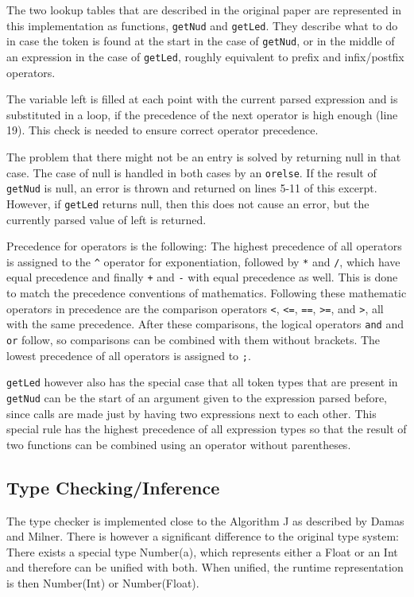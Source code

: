 \documentclass[12pt]{article}
\begin{document}
The two lookup tables that are described in the original paper are represented
in this implementation as functions,
\texttt{getNud} and \texttt{getLed}.
They describe what to do in case the token is found at the start in the case of \texttt{getNud},
or in the middle of an expression in the case of \texttt{getLed}, roughly equivalent to
prefix and infix/postfix operators.

The variable left is filled at each point with the current parsed expression
and is substituted in a loop, if the precedence of the next operator is high enough (line 19).
This check is needed to ensure correct operator precedence.

The problem that there might not be an entry is solved by returning null
in that case. The case of null is handled in both cases by an \texttt{orelse}.
If the result of \texttt{getNud} is null, an error is thrown and returned on lines 5-11 of this excerpt.
However, if \texttt{getLed} returns null, then this does not cause an error, but the currently parsed value of
left is returned.

Precedence for operators is the following:
The highest precedence of all operators is assigned to the \texttt{\^} operator for exponentiation,
followed by \texttt{*} and \texttt{/}, which have equal precedence and finally \texttt{+} and \texttt{-} with equal
precedence as well. This is done to match the precedence conventions of mathematics.
Following these mathematic operators in precedence are the comparison operators
\texttt{<}, \texttt{<=}, \texttt{==}, \texttt{>=}, and \texttt{>}, all with the same precedence.
After these comparisons, the logical operators \texttt{and} and \texttt{or} follow,
so comparisons can be combined with them without brackets.
The lowest precedence of all operators is assigned to \texttt{;}.

\texttt{getLed} however also has the special case that all token types that are present in \texttt{getNud}
can be the start of an argument given to the expression parsed before, since calls are
made just by having two expressions next to each other.
This special rule has the highest precedence of all expression types
so that the result of two functions can be combined using an operator without parentheses.

\subsection{Type Checking/Inference}
The type checker is implemented close to the Algorithm J as described
by Damas and Milner\autocite{damasPrincipalTypeschemesFunctional1982}.
There is however a significant difference to the original type system:
There exists a special type Number(a), which represents either a Float or an Int
and therefore can be unified with both. When unified, the runtime representation
is then Number(Int) or Number(Float).
\end{document}
